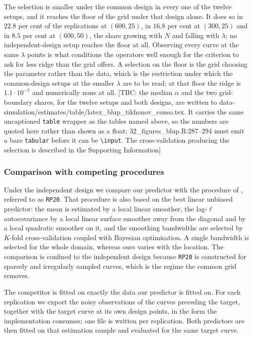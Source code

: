 The selection is smaller under the common design in every one of the twelve setups, and it reaches the floor of the grid under that design alone. It does so in $22.8$ per cent of the replications at $(600, 25)$, in $16.8$ per cent at $(300, 25)$ and in $8.5$ per cent at $(600, 50)$, the share growing with $N$ and falling with $\lambda$; no independent-design setup reaches the floor at all. Observing every curve at the same $\lambda$ points is what conditions the operators well enough for the criterion to ask for less ridge than the grid offers. A selection on the floor is the grid choosing the parameter rather than the data, which is the restriction under which the common-design setups at the smaller $\lambda$ are to be read; at that floor the ridge is $1.1\cdot 10^{-7}$ and numerically none at all.
[TBC: the median $\alpha$ and the two grid-boundary shares, for the twelve setups and both designs, are written to data-simulation/estimates/table/latex\_blup\_tikhonov\_conso.tex. It carries the same uncaptioned \texttt{table} wrapper as the tables named above, so the numbers are quoted here rather than shown as a float; 32\_figures\_blup.R:287--294 must emit a bare \texttt{tabular} before it can be \texttt{\textbackslash input}. The cross-validation producing the selection is described in the Supporting Information]
\color{black}

\subsubsection{\color{magenta}Comparison with competing procedures\color{black}}

\color{magenta}
Under the independent design we compare our predictor with the procedure of \citet{rubin2020sparsely}, referred to as \texttt{RP20}. That procedure is also based on the best linear unbiased predictor: the mean is estimated by a local linear smoother, the lag-$\ell$ autocovariance by a local linear surface smoother away from the diagonal and by a local quadratic smoother on it, and the smoothing bandwidths are selected by $K$-fold cross-validation coupled with Bayesian optimisation. A single bandwidth is selected for the whole domain, whereas ours varies with the location. The comparison is confined to the independent design because \texttt{RP20} is constructed for sparsely and irregularly sampled curves, which is the regime the common grid removes.

The competitor is fitted on exactly the data our predictor is fitted on. For each replication we export the noisy observations of the curves preceding the target, together with the target curve at its own design points, in the form the implementation consumes; one file is written per replication. Both predictors are then fitted on that estimation sample and evaluated for the same target curve.

